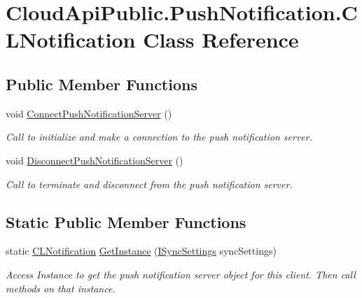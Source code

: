 \hypertarget{class_cloud_api_public_1_1_push_notification_1_1_c_l_notification}{\section{Cloud\-Api\-Public.\-Push\-Notification.\-C\-L\-Notification Class Reference}
\label{class_cloud_api_public_1_1_push_notification_1_1_c_l_notification}
}
\subsection*{Public Member Functions}
\begin{DoxyCompactItemize}
\item 
void \hyperlink{class_cloud_api_public_1_1_push_notification_1_1_c_l_notification_a9613f83aa843ce53be54f94f8c576d34}{Connect\-Push\-Notification\-Server} ()
\begin{DoxyCompactList}\small\item\em Call to initialize and make a connection to the push notification server. \end{DoxyCompactList}\item 
void \hyperlink{class_cloud_api_public_1_1_push_notification_1_1_c_l_notification_a121fca2675b1ac57dac038554edf8fb9}{Disconnect\-Push\-Notification\-Server} ()
\begin{DoxyCompactList}\small\item\em Call to terminate and disconnect from the push notification server. \end{DoxyCompactList}\end{DoxyCompactItemize}
\subsection*{Static Public Member Functions}
\begin{DoxyCompactItemize}
\item 
static \hyperlink{class_cloud_api_public_1_1_push_notification_1_1_c_l_notification}{C\-L\-Notification} \hyperlink{class_cloud_api_public_1_1_push_notification_1_1_c_l_notification_ae43f349b8c7987fc76686b2f89f3223b}{Get\-Instance} (\hyperlink{interface_cloud_api_public_1_1_interfaces_1_1_i_sync_settings}{I\-Sync\-Settings} sync\-Settings)
\begin{DoxyCompactList}\small\item\em Access Instance to get the push notification server object for this client. Then call methods on that instance. \end{DoxyCompactList}\end{DoxyCompactItemize}
